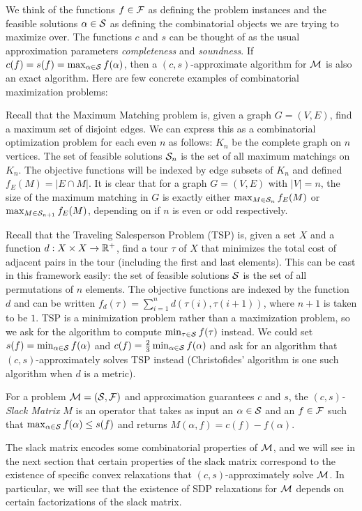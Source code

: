 We think of the functions $f \in \mathcal F$ as defining the problem instances and the feasible solutions $\alpha \in \mathcal S$ as defining the combinatorial objects we are
trying to maximize over. The functions $c$ and $s$ can be thought of as the usual approximation parameters \emph{completeness} and \emph{soundness}. If $c(f) = s(f) = \max_{\alpha \in \mathcal S} f(\alpha)$, then a $(c,s)$-approximate algorithm for $\mathcal M$ is also an exact algorithm. Here are few concrete examples of combinatorial maximization problems:
\begin{example}\label{ex:matching}
    Recall that the Maximum Matching problem is, given a graph $G = (V,E)$, find a maximum set of disjoint edges. We can express this as a combinatorial optimization problem for each even $n$ as follows: $K_n$ be the complete graph on $n$ vertices. The set of feasible solutions $\mathcal S_n$ is the set of all maximum matchings on $K_n$. The objective functions will be indexed by edge subsets of $K_n$ and defined $f_E(M) = |E \cap M|$. It is clear that for a graph $G = (V, E)$ with $|V| = n$, the size of the maximum matching in $G$ is exactly either $\max_{M \in \mathcal S_n} f_E(M)$ or $\max_{M \in \mathcal S_{n+1}} f_E(M)$, depending on if $n$ is even or odd respectively.
\end{example}
\begin{example}
Recall that the Traveling Salesperson Problem (\textsc{TSP}) is, given a set $X$ and a function $d: X\times X \rightarrow \mathbb R^+$, find a tour $\tau$ of $X$ that minimizes the total cost of adjacent pairs in the tour (including the first and last elements). This can be cast in this framework easily: the set of feasible solutions $\mathcal S$ is the set of all permutations of $n$ elements. The objective functions are indexed by the function $d$ and can be written $f_d(\tau) = \sum_{i=1}^n d(\tau(i),\tau(i+1))$, where $n+1$ is taken to be $1$. TSP is a minimization problem rather than a maximization problem, so we ask for the algorithm to compute $\min_{\tau \in \mathcal S} f(\tau)$ instead. We could set $s(f) = \min_{\alpha \in \mathcal S} f(\alpha)$ and $c(f) = \frac{2}{3}\min_{\alpha \in \mathcal S} f(\alpha)$ and ask for an algorithm that $(c,s)$-approximately solves \textsc{TSP} instead (Christofides' algorithm \cite{Chri76} is one such algorithm when $d$ is a metric).
\end{example}
\begin{definition}
    For a problem $\mathcal M = (\mathcal S, \mathcal F)$ and approximation guarantees $c$ and $s$, the \emph{$(c,s)$-Slack Matrix} $M$ is an operator that takes as input an $\alpha \in \mathcal S$ and an $f \in \mathcal F$ such that $\max_{\alpha \in \mathcal S} f(\alpha) \leq s(f)$ and returns $M(\alpha,f) = c(f) - f(\alpha)$.
\end{definition}
The slack matrix encodes some combinatorial properties of $\mathcal M$, and we will see in the next section that certain properties of the slack matrix correspond to the existence of specific convex relaxations that $(c,s)$-approximately solve $\mathcal M$. In particular, we will see that the existence of SDP relaxations for $\mathcal M$ depends on certain factorizations of the slack matrix.

